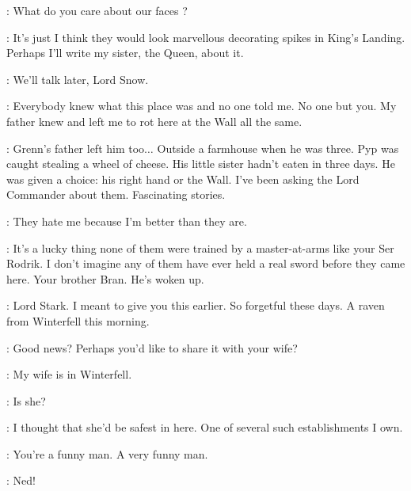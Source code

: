 \RAST: What do you care about our faces ? 

\TYRION: It's just I think they would look marvellous decorating spikes in King's Landing. Perhaps I'll write my sister, the Queen, about it. 

\GRENN: We'll talk later, Lord Snow. 


\JON: Everybody knew what this place was and no one told me. No one but you. My father knew and left me to rot here at the Wall all the same. 

\TYRION: Grenn's father left him too$\ldots$ Outside a farmhouse when he was three. Pyp was caught stealing a wheel of cheese. His little sister hadn't eaten in three days. He was given a choice: his right hand or the Wall. I've been asking the Lord Commander about them. Fascinating stories. 

\JON: They hate me because I'm better than they are. 

\TYRION: It's a lucky thing none of them were trained by a master-at-arms like your Ser Rodrik. I don't imagine any of them have ever held a real sword before they came here. Your brother Bran. He's woken up. 



\PYCELLE: Lord Stark. I meant to give you this earlier. So forgetful these days. A raven from Winterfell this morning. 


\LITTLEFINGER: Good news? Perhaps you'd like to share it with your wife? 

\NED: My wife is in Winterfell. 

\LITTLEFINGER: Is she? 


\LITTLEFINGER: I thought that she'd be safest in here. One of several such establishments I own. 


\NED: You're a funny man. A very funny man. 

\CATELYN:  Ned! 


